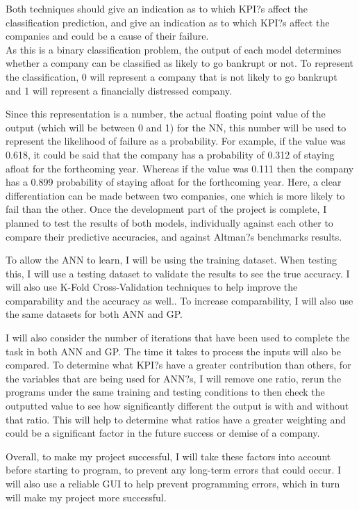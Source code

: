\documentclass[11pt]{article}
\begin{document}
Both techniques should give an indication as to which KPI?s affect the classification prediction, and give an indication as to which KPI?s affect the companies and could be a cause of their failure.  \\
As this is a binary classification problem, the output of each model determines whether a company can be classified as likely to go bankrupt or not. To represent the classification,  0 will represent a company that is not likely to go bankrupt  and 1 will represent a financially distressed company.

Since this representation is a number, the actual floating point value of the output (which will be between 0 and 1) for the NN, this number will be used to represent the likelihood of failure as a probability. For example, if the value was 0.618, it could be said that the company has a probability of 0.312 of staying afloat for the forthcoming year. Whereas if the value was 0.111 then the company has a 0.899 probability of staying afloat for the forthcoming year. Here, a clear differentiation can be made between two companies, one which is more likely to fail than the other.
Once the development part of the project is complete, I planned to test the results of both models, individually against each other to compare their predictive accuracies, and against Altman?s benchmarks results.

To allow the ANN to learn, I will be using the training dataset. When testing this, I will use a testing dataset to validate the results to see the true accuracy. I will also use K-Fold Cross-Validation techniques to help improve the comparability and the accuracy as well.. To increase comparability, I will also use the same datasets for both ANN and GP.

I will also consider the number of iterations that have been used to complete the task in both ANN and GP. The time it takes to process the inputs will also be compared. To determine what KPI?s have a greater contribution than others, for the variables that are being used for ANN?s, I will remove one ratio, rerun the programs under the same training and testing conditions to then check the outputted value to see how significantly different the output is with and without that ratio. This will help to determine what ratios have a greater weighting and could be a significant factor in the future success or demise of a company. 

Overall, to make my project successful, I will take these factors into account before starting to program, to prevent any long-term errors that could occur. I will also use a reliable GUI to help prevent programming errors, which in turn will make my project more successful. 
\end{document}
